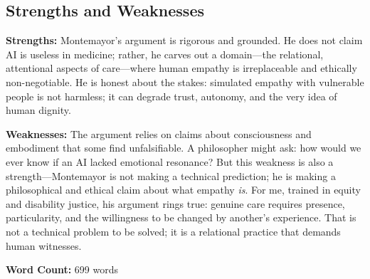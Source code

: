 \documentclass[12pt,twoside]{article}
\begin{document}
\subsection*{Strengths and Weaknesses}

\textbf{Strengths:} Montemayor's argument is rigorous and grounded. He does not claim AI is useless in medicine; rather, he carves out a domain---the relational, attentional aspects of care---where human empathy is irreplaceable and ethically non-negotiable. He is honest about the stakes: simulated empathy with vulnerable people is not harmless; it can degrade trust, autonomy, and the very idea of human dignity.

\textbf{Weaknesses:} The argument relies on claims about consciousness and embodiment that some find unfalsifiable. A philosopher might ask: how would we ever know if an AI lacked emotional resonance? But this weakness is also a strength---Montemayor is not making a technical prediction; he is making a philosophical and ethical claim about what empathy \textit{is}. For me, trained in equity and disability justice, his argument rings true: genuine care requires presence, particularity, and the willingness to be changed by another's experience. That is not a technical problem to be solved; it is a relational practice that demands human witnesses.

\vfill
\noindent\textbf{Word Count:} 699 words
\end{document}
